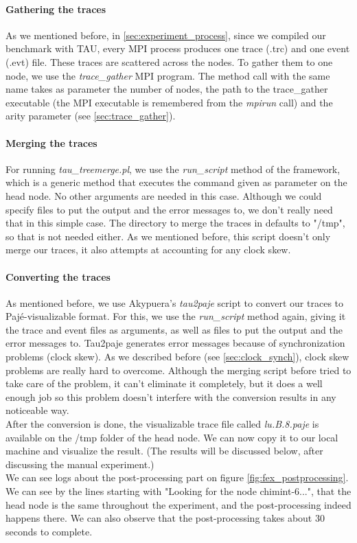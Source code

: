 \paragraph{Gathering the traces}
As we mentioned before, in \ref{sec:experiment_process}, since we
compiled our benchmark with TAU, every MPI process produces
one trace (.trc) and one event (.evt) file. These traces are scattered
across the nodes. To gather them to one node, we use
the \emph{trace\_gather} MPI program. The method call with the same
name takes as parameter the number of nodes, the path to
the trace\_gather executable (the MPI executable is remembered
from the \emph{mpirun} call) and the arity parameter
(see \ref{sec:trace_gather}).
\paragraph{Merging the traces}
For running \emph{tau\_treemerge.pl}, we use the \emph{run\_script}
method of the framework, which is a generic method that executes the
command given as parameter on the head node. No other arguments are
needed in this case. Although we could specify files to put the output
and the error messages to, we don't really need that in this simple
case. The directory to merge the traces in defaults to "/tmp", so that
is not needed either. As we mentioned before, this script doesn't only
merge our traces, it also attempts at accounting for any clock skew.
\paragraph{Converting the traces}
As mentioned before, we use Akypuera's\cite{s13} \emph{tau2paje}
script to convert our traces to Pajé-visualizable format. For this, we
use the \emph{run\_script} method again, giving it the trace and event
files as arguments, as well as files to put the output and the error
messages to. Tau2paje generates error messages because of
synchronization problems (clock skew). As we described before
(see \ref{sec:clock_synch}), clock skew problems are really hard to
overcome. Although the merging script before tried to take care of the
problem, it can't eliminate it completely, but it does a well enough
job so this problem doesn't interfere with the conversion results in
any noticeable way.\\
After the conversion is done, the visualizable trace file called
\emph{lu.B.8.paje} is available on the /tmp folder of the head
node. We can now copy it to our local machine and visualize the
result. (The results will be discussed below, after discussing the
manual experiment.)\\
We can see logs about the post-processing part on
figure \ref{fig:fex_postprocessing}. We can see by the lines starting
with "Looking for the node chimint-6...", that the head node is the
same throughout the experiment, and the post-processing indeed happens
there. We can also observe that the post-processing takes about 30
seconds to complete.

